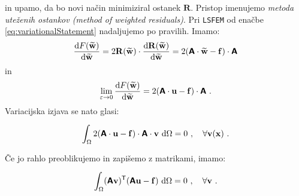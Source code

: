 in upamo, da bo novi način minimiziral ostanek $\mathbf{R}$. Pristop imenujemo \emph{metoda uteženih ostankov (method of weighted residuals)}. Pri \texttt{LSFEM} od enačbe \eqref{eq:variationalStatement} nadaljujemo po pravilih. Imamo:
\begin{equation}
	\frac{\mathrm{d} F(\widetilde{\mathbf{w}})}{\mathrm{d} \widetilde{\mathbf{w}}} = 2 \mathbf{R(\widetilde{w})} \cdot \frac{\mathrm{d} \mathbf{R(\widetilde{w})}}{\mathrm{d} \mathbf{\widetilde{w}}} = 2 (\bm{\mathsf{A}} \cdot \mathbf{\widetilde{w}} - \mathbf{f}) \cdot \bm{\mathsf{A}}
\end{equation}
in
\begin{equation}
	\lim_{\varepsilon \rightarrow 0} \frac{\mathrm{d} F(\widetilde{\mathbf{w}})}{\mathrm{d} \widetilde{\mathbf{w}}} = 2 (\bm{\mathsf{A}} \cdot \mathbf{u} - \mathbf{f}) \cdot \bm{\mathsf{A}} \ .
\end{equation}
Variacijska izjava se nato glasi:
\begin{equation}
	\int_{\Omega} 2 (\mathbsf{A} \cdot \mathbf{u} - \mathbf{f}) \cdot \mathbsf{A} \cdot \mathbf{v} \ \ud \Omega = 0 \ , \quad \forall \mathbf{v(\mathbf{x})} \ . \vphantom{\Biggr{)}}
\end{equation}
Če jo rahlo preoblikujemo in zapišemo z matrikami, imamo:
\begin{equation}
	\int_{\Omega} (\mathbsf{A} \mathbf{v})^\mathsf{T} (\mathbsf{A} \mathbf{u} - \mathbf{f}) \ \ud \Omega = 0 \ , \quad \forall \mathbf{v} \ . \vphantom{\Biggr{)}}
\end{equation}